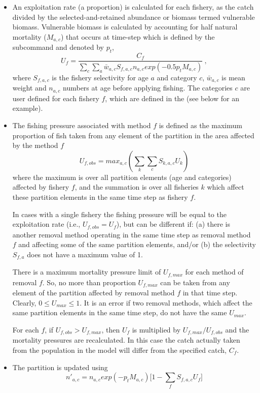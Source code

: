 \begin{itemize}
	\item An exploitation rate (a proportion) is calculated for each fishery, as the catch divided by the selected-and-retained abundance or biomass termed vulnerable biomass. Vulnerable biomass is calculated by accounting for half natural mortality (\(M_{a,c}\)) that occurs at time-step which is defined by the subcommand  and denoted by \(p_t\),
	$$U_{f} = \frac{C_f}{\sum\limits_{c}\sum\limits_a \bar{w}_{a,c} S_{f,a,c} n_{a,c} exp(-0.5 p_t M_{a,c})} \ ,$$
	where \(S_{f,a,c}\) is the fishery selectivity for age \(a\) and category \(c\), \(\bar{w}_{a,c}\) is mean weight and \(n_{a,c}\) numbers at age before applying fishing. The categories \(c\) are user defined for each fishery \(f\), which are defined in the  (see below for an example).
	\item The fishing pressure associated with method $f$ is defined as the maximum proportion of fish taken from any element of the partition in the area affected by the method $f$
	$$ U_{f,obs} = max_{a,c}(\sum\limits_k\sum\limits_c S_{k,a,c} U_k) $$
	where the maximum is over all partition elements (age and categories) affected by fishery $f$, and the summation is over all fisheries $k$ which affect these partition elements in the same time step as fishery $f$.

	In cases with a single fishery the fishing pressure will be equal to the exploitation rate (i.e., $U_{f,obs} = U_f$), but can be different if: (a) there is another removal method operating in the same time step as removal method $f$ and affecting some of the same partition elements, and/or (b) the selectivity $S_{f,a}$ does not have a maximum value of 1.

	There is a maximum mortality pressure limit of $U_{f,max}$ for each method of removal $f$. So, no more than proportion $U_{f,max}$ can be taken from any element of the partition affected by removal method $f$ in that time step. Clearly, $0 \leq U_{max} \leq 1$. It is an error if two removal methods, which affect the same partition elements in the same time step, do not have the same $U_{max}$.

	For each $f$, if $U_{f,obs} > U_{f,max}$, then $U_f$ is multiplied by $U_{f,max}/U_{f,obs}$ and the mortality pressures are recalculated. In this case the catch actually taken from the population in the model will differ from the specified catch, $C_f$.

	\item The partition is updated using
		$$ n'_{a,c} = n_{a,c} exp(-p_t M_{a,c})\big[1 - \sum_f S_{f,a,c} U_{f} \big] $$
\end{itemize}

